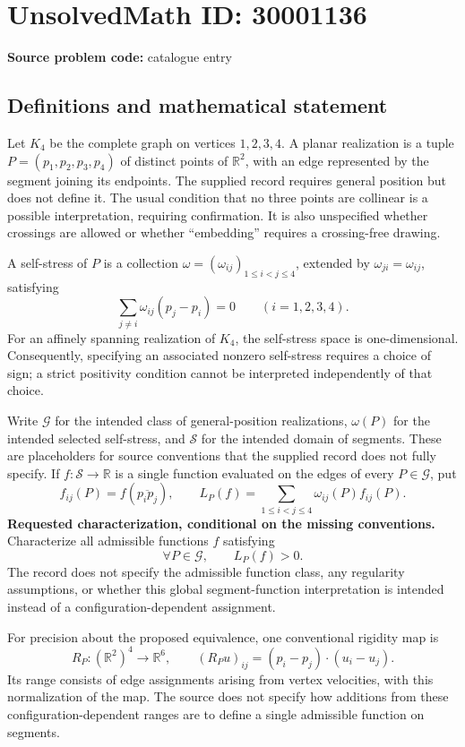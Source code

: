 \documentclass[11pt]{article}
\newcommand{\R}{\mathbb{R}}
\begin{document}
\section*{UnsolvedMath ID: 30001136}
\textbf{Source problem code:} catalogue entry
\subsection{Definitions and mathematical statement}
Let \(K_4\) be the complete graph on vertices \(1,2,3,4\). A planar realization is a tuple \(P=(p_1,p_2,p_3,p_4)\) of distinct points of \(\R^2\), with an edge represented by the segment joining its endpoints. The supplied record requires general position but does not define it. The usual condition that no three points are collinear is a possible interpretation, requiring confirmation. It is also unspecified whether crossings are allowed or whether ``embedding'' requires a crossing-free drawing.

A self-stress of \(P\) is a collection \(\omega=(\omega_{ij})_{1\leq i<j\leq4}\), extended by \(\omega_{ji}=\omega_{ij}\), satisfying
\[
\sum_{j\ne i}\omega_{ij}(p_j-p_i)=0
\qquad (i=1,2,3,4).
\]
For an affinely spanning realization of \(K_4\), the self-stress space is one-dimensional. Consequently, specifying an associated nonzero self-stress requires a choice of sign; a strict positivity condition cannot be interpreted independently of that choice.

Write \(\mathcal G\) for the intended class of general-position realizations, \(\omega(P)\) for the intended selected self-stress, and \(\mathcal S\) for the intended domain of segments. These are placeholders for source conventions that the supplied record does not fully specify. If \(f:\mathcal S\to\R\) is a single function evaluated on the edges of every \(P\in\mathcal G\), put
\[
f_{ij}(P)=f(\overline{p_ip_j}),\qquad
L_P(f)=\sum_{1\leq i<j\leq4}\omega_{ij}(P)f_{ij}(P).
\]
\textbf{Requested characterization, conditional on the missing conventions.} Characterize all admissible functions \(f\) satisfying
\[
\forall P\in\mathcal G,\qquad L_P(f)>0.
\]
The record does not specify the admissible function class, any regularity assumptions, or whether this global segment-function interpretation is intended instead of a configuration-dependent assignment.

For precision about the proposed equivalence, one conventional rigidity map is
\[
R_P:(\R^2)^4\longrightarrow\R^6,\qquad
(R_Pu)_{ij}=(p_i-p_j)\mathbin{\cdot}(u_i-u_j).
\]
Its range consists of edge assignments arising from vertex velocities, with this normalization of the map. The source does not specify how additions from these configuration-dependent ranges are to define a single admissible function on segments.
\end{document}
